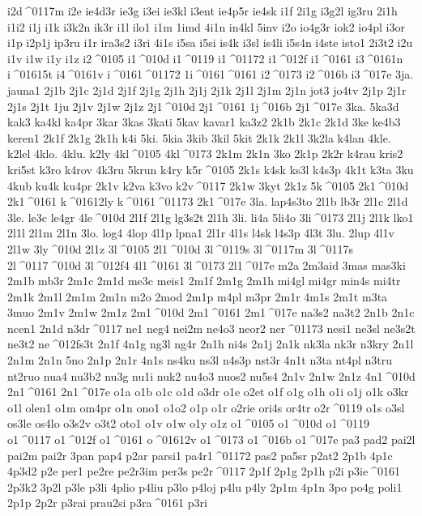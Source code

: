 {i2d^^^^0117m
i2e
ie4d3r
ie3g
i3ei
ie3kl
i3ent
ie4p5r
ie4sk
i1f
2i1g
i3g2l
ig3ru
2i1h
i1i2
i1j
i1k
i3k2n
ik3r
i1l
ilo1
i1m
1imd
4i1n
in4kl
5inv
i2o
io4g3r
iok2
io4pl
i3or
i1p
i2p1j
ip3ru
i1r
ira3s2
i3ri
4i1s
i5sa
i5si
is4k
i3sl
is4li
i5s4n
i4ste
isto1
2i3t2
i2u
i1v
i1w
i1y
i1z
i2^^^^0105
i1^^^^010d
i1^^^^0119
i1^^^^01172
i1^^^^012f
i1^^^^0161
i3^^^^0161n
i^^^^01615t
i4^^^^0161v
i^^^^0161^^^^01172
1i^^^^0161^^^^0161
i2^^^^0173
i2^^^^016b
i3^^^^017e
3ja.
jauna1
2j1b
2j1c
2j1d
2j1f
2j1g
2j1h
2j1j
2j1k
2j1l
2j1m
2j1n
jot3
jo4tv
2j1p
2j1r
2j1s
2j1t
1ju
2j1v
2j1w
2j1z
2j1^^^^010d
2j1^^^^0161
1j^^^^016b
2j1^^^^017e
3ka.
5ka3d
kak3
ka4kl
ka4pr
3kar
3kas
3kati
5kav
kavar1
ka3z2
2k1b
2k1c
2k1d
3ke
ke4b3
keren1
2k1f
2k1g
2k1h
k4i
5ki.
5kia
3kib
3kil
5kit
2k1k
2k1l
3k2la
k4lan
4kle.
k2lel
4klo.
4klu.
k2ly
4kl^^^^0105
4kl^^^^0173
2k1m
2k1n
3ko
2k1p
2k2r
k4rau
kris2
kri5st
k3ro
k4rov
4k3ru
5krun
k4ry
k5r^^^^0105
2k1s
k4sk
ks3l
k4s3p
4k1t
k3ta
3ku
4kub
ku4k
ku4pr
2k1v
k2va
k3vo
k2v^^^^0117
2k1w
3kyt
2k1z
5k^^^^0105
2k1^^^^010d
2k1^^^^0161
k^^^^01612ly
k^^^^0161^^^^01173
2k1^^^^017e
3la.
lap4s3to
2l1b
lb3r
2l1c
2l1d
3le.
le3c
le4gr
4le^^^^010d
2l1f
2l1g
lg3s2t
2l1h
3li.
li4a
5li4o
3li^^^^0173
2l1j
2l1k
lko1
2l1l
2l1m
2l1n
3lo.
log4
4lop
4l1p
lpna1
2l1r
4l1s
l4sk
l4s3p
4l3t
3lu.
2lup
4l1v
2l1w
3ly^^^^010d
2l1z
3l^^^^0105
2l1^^^^010d
3l^^^^0119s
3l^^^^0117m
3l^^^^0117s
2l^^^^0117^^^^010d
3l^^^^012f4
4l1^^^^0161
3l^^^^0173
2l1^^^^017e
m2a
2m3aid
3mas
mas3ki
2m1b
mb3r
2m1c
2m1d
me3c
meis1
2m1f
2m1g
2m1h
mi4gl
mi4gr
min4s
mi4tr
2m1k
2m1l
2m1m
2m1n
m2o
2mod
2m1p
m4pl
m3pr
2m1r
4m1s
2m1t
m3ta
3muo
2m1v
2m1w
2m1z
2m1^^^^010d
2m1^^^^0161
2m1^^^^017e
na3s2
na3t2
2n1b
2n1c
ncen1
2n1d
n3dr^^^^0117
ne1
neg4
nei2m
ne4o3
neor2
ner^^^^01173
nesi1
ne3sl
ne3s2t
ne3t2
ne^^^^012fs3t
2n1f
4n1g
ng3l
ng4r
2n1h
ni4s
2n1j
2n1k
nk3la
nk3r
n3kry
2n1l
2n1m
2n1n
5no
2n1p
2n1r
4n1s
ns4ku
ns3l
n4s3p
nst3r
4n1t
n3ta
nt4pl
n3tru
nt2ruo
nua4
nu3b2
nu3g
nu1i
nuk2
nu4o3
nuos2
nu5s4
2n1v
2n1w
2n1z
4n1^^^^010d
2n1^^^^0161
2n1^^^^017e
o1a
o1b
o1c
o1d
o3dr
o1e
o2et
o1f
o1g
o1h
o1i
o1j
o1k
o3kr
o1l
olen1
o1m
om4pr
o1n
ono1
o1o2
o1p
o1r
o2rie
ori4s
or4tr
o2r^^^^0119
o1s
o3sl
os3le
os4lo
o3s2v
o3t2
oto1
o1v
o1w
o1y
o1z
o1^^^^0105
o1^^^^010d
o1^^^^0119
o1^^^^0117
o1^^^^012f
o1^^^^0161
o^^^^01612v
o1^^^^0173
o1^^^^016b
o1^^^^017e
pa3
pad2
pai2l
pai2m
pai2r
3pan
pap4
p2ar
parsi1
pa4r1^^^^01172
pas2
pa5sr
p2at2
2p1b
4p1c
4p3d2
p2e
per1
pe2re
pe2r3im
per3s
pe2r^^^^0117
2p1f
2p1g
2p1h
p2i
p3ie^^^^0161
2p3k2
3p2l
p3le
p3li
4plio
p4liu
p3lo
p4loj
p4lu
p4ly
2p1m
4p1n
3po
po4g
poli1
2p1p
2p2r
p3rai
prau2si
p3ra^^^^0161
p3ri
}
